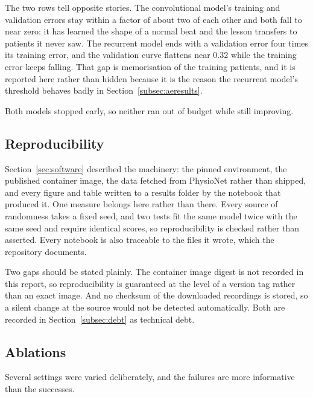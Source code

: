 \documentclass[a4paper, 12pt]{article}
\begin{document}
The two rows tell opposite stories. The convolutional model's training and
validation errors stay within a factor of about two of each other and both fall to
near zero: it has learned the shape of a normal beat and the lesson transfers to
patients it never saw. The recurrent model ends with a validation error four times
its training error, and the validation curve flattens near \num{0.32} while the
training error keeps falling. That gap is memorisation of the training patients,
and it is reported here rather than hidden because it is the reason the recurrent
model's threshold behaves badly in Section~\ref{subsec:aeresults}.

Both models stopped early, so neither ran out of budget while still improving.

\subsection{Reproducibility} \label{subsec:reproducibility}

Section~\ref{sec:software} described the machinery: the pinned environment, the
published container image, the data fetched from PhysioNet rather than shipped,
and every figure and table written to a results folder by the notebook that
produced it. One measure belongs here rather than there. Every source of randomness
takes a fixed seed, and two tests fit the same model twice with the same seed and
require identical scores, so reproducibility is checked rather than asserted. Every
notebook is also traceable to the files it wrote, which the repository documents.

Two gaps should be stated plainly. The container image digest is not recorded in
this report, so reproducibility is guaranteed at the level of a version tag rather
than an exact image. And no checksum of the downloaded recordings is stored, so a
silent change at the source would not be detected automatically. Both are recorded
in Section~\ref{subsec:debt} as technical debt.

\subsection{Ablations} \label{subsec:ablations}

Several settings were varied deliberately, and the failures are more informative
than the successes.
\end{document}
